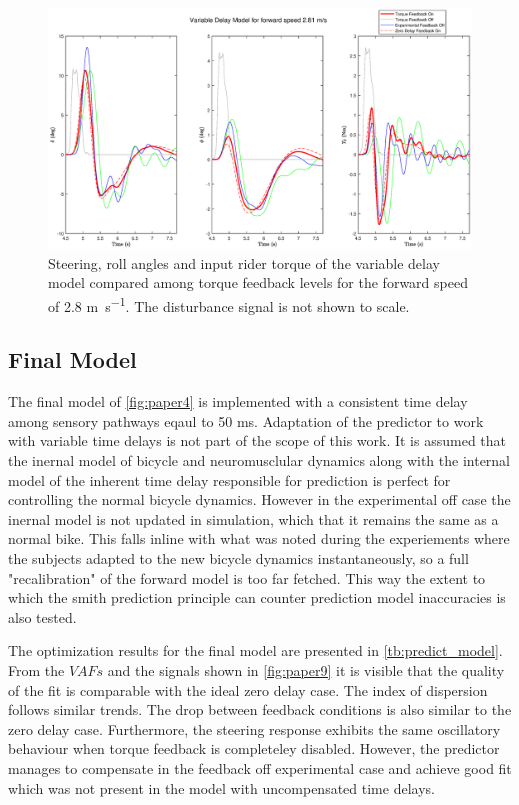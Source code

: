 \begin{figure}[!h]
    \centering
    \captionsetup{justification=centering,margin=2cm}

    \includegraphics[width=\textwidth]{images/variable_delay_compare.eps}
    \caption{Steering, roll angles and input rider torque of the variable delay model  compared among torque feedback levels  for the forward speed of 2.8 \si{\meter\per\second}. The disturbance signal is not shown  to scale.}
    \label{fig:paper8}
\end{figure}


    \subsection{Final Model}

The final model of  \cref{fig:paper4} is implemented with a consistent time delay among sensory pathways eqaul to 50 \si{\milli\second}. Adaptation of the predictor to work with variable time delays is not part of the scope of this work. It is assumed that the inernal model of bicycle and neuromusclular dynamics along with the internal model of the inherent time delay responsible for prediction is perfect for controlling the normal bicycle dynamics. However in the experimental off case the inernal model is not updated in simulation, which that  it remains the same as a normal bike. This falls inline with what was noted during the experiements where the subjects adapted to the new bicycle dynamics instantaneously, so a full "recalibration" of the forward model is too far fetched. This way the extent to which the smith prediction principle can counter prediction model inaccuracies is also tested. 


The optimization results for the final model are presented in \cref{tb:predict_model}. From the \ensuremath{\mathit{VAF}s} and the signals shown in \cref{fig:paper9} it is visible that the quality of the fit is comparable with the ideal zero delay case. The index of dispersion follows similar trends. The drop between feedback conditions is also similar to the zero delay case. Furthermore, the steering response exhibits  the same oscillatory behaviour when torque feedback is completeley disabled. However, the predictor manages to compensate in the feedback off experimental case and achieve good fit which was not present in the model with uncompensated time delays. 

